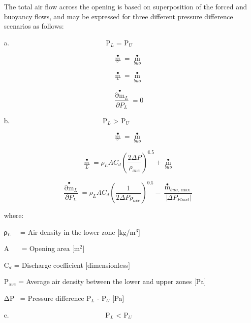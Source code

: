 The total air flow across the opening is based on superposition of the forced and buoyancy flows, and may be expressed for three different pressure difference scenarios as follows:

a.~~~~~~~~~~~~~~~~~~~~~~~~~~~~P\(_{L}\) = P\(_{U}\)

\begin{equation}
{\mathop m\limits^ \bullet_{_U}} = {\mathop m\limits^ \bullet_{buo}}
\end{equation}

\begin{equation}
{\mathop m\limits^ \bullet_{_L}} = {\mathop m\limits^ \bullet_{buo}}
\end{equation}

\begin{equation}
\frac{{{{\mathop {\partial m}\limits^ \bullet  }_L}}}{{\partial {P_L}}} = 0
\end{equation}

b.~~~~~~~~~~~~~~~~~~~~~~~~~~~P\(_{L}\) \textgreater{} P\(_{U}\)

\begin{equation}
{\mathop m\limits^ \bullet_{_U}} = {\mathop m\limits^ \bullet_{buo}}
\end{equation}

\begin{equation}
{\mathop m\limits^ \bullet_L} = {\rho_L}A{C_d}{\left( {\frac{{2\Delta P}}{{{\rho_{ave}}}}} \right)^{0.5}} + {\mathop m\limits^ \bullet_{buo}}
\end{equation}

\begin{equation}
\frac{{{{\mathop {\partial m}\limits^ \bullet  }_L}}}{{\partial {P_L}}} = {\rho_L}A{C_d}{\left( {\frac{1}{{2\Delta P{\rho_{ave}}}}} \right)^{0.5}} - \frac{{{{\mathop m\limits^ \bullet  }_{buo,\max }}}}{{\left| {\Delta {P_{Flood}}} \right|}}
\end{equation}

where:

ρ\(_{L}\)~~ = Air density in the lower zone {[}kg/m\(^{3}\){]}

A~~~ = Opening area {[}m\(^{2}\){]}

C\(_{d}\) = Discharge coefficient {[}dimensionless{]}

Ρ\(_{ave}\) = Average air density between the lower and upper zones {[}Pa{]}

ΔP~ = Pressure difference P\(_{L}\) - P\(_{U}\) {[}Pa{]}

c.~~~~~~~~~~~~~~~~~~~~~~~~~~~~P\(_{L}\) \textless{} P\(_{U}\)

